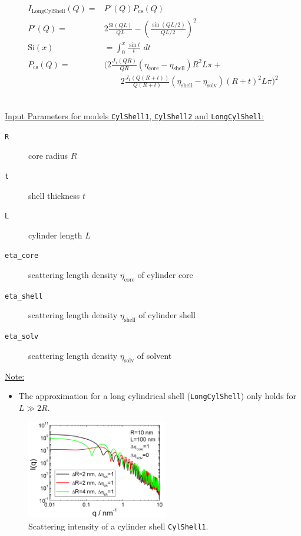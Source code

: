 \begin{align}
  I_\text{LongCylShell}(Q) = & P'(Q) P_\text{cs}(Q) \\
  P'(Q)  = & 2 \frac{\text{Si}(Q L)}{QL} - \left(\frac{\sin(QL/2)}{QL/2}\right)^2 \\
  \text{Si}(x) & = \int_0^x\!\frac{\sin t}{t}\,\,dt \\
  P_\text{cs}(Q)  =  & \biggl(
            2\frac{J_1(QR)}{QR}
            \left(\eta_\text{core}-\eta_\text{shell}\right)R^2L\pi + \\
         & \qquad
            2\frac{J_1(Q(R+t))}{Q(R+t)}
            \left(\eta_\text{shell}-\eta_\text{solv}\right)(R+t)^2L\pi
      \biggr)^2  \nonumber
\end{align}


\vspace{5mm}

\hspace{1pt}\\
\underline{Input Parameters for models \texttt{CylShell1}, \texttt{CylShell2} and \texttt{LongCylShell}:}\\
\begin{description}
\item[\texttt{R}] core radius $R$
\item[\texttt{t}] shell thickness $t$
\item[\texttt{L}] cylinder length $L$
\item[\texttt{eta\_core}] scattering length density $\eta_\text{core}$ of cylinder core
\item[\texttt{eta\_shell}] scattering length density $\eta_\text{shell}$ of cylinder shell
\item[\texttt{eta\_solv}] scattering length density $\eta_\text{solv}$ of solvent
\end{description}

\underline{Note:}
\begin{itemize}
\item The approximation for a long cylindrical shell (\texttt{LongCylShell}) only holds for $L \gg 2R$.
\end{itemize}

\begin{figure}[htb]
\begin{center}
\includegraphics[width=0.55\textwidth]{../images/form_factor/cylindrical_obj/CylShell1IQ.png}
\end{center}
\caption{Scattering intensity of a cylinder shell \texttt{CylShell1}.}
\label{fig:CylShell1}
\end{figure}

